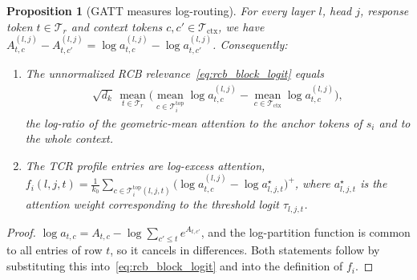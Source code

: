 \documentclass{article}
\newtheorem{proposition}{Proposition}
\begin{document}
\begin{proposition}[GATT measures log-routing]\label{prop:gatt_log_routing}
For every layer $l$, head $j$, response token $t \in \mathcal{T}_r$ and context tokens $c, c' \in \mathcal{T}_{\text{ctx}}$, we have $A^{(l,j)}_{t,c} - A^{(l,j)}_{t,c'} = \log a^{(l,j)}_{t,c} - \log a^{(l,j)}_{t,c'}$. Consequently:
\begin{enumerate}
    \item[(i)] The unnormalized RCB relevance~\eqref{eq:rcb_block_logit} equals
    \begin{align}
        \sqrt{d_k}\, \operatorname*{mean}_{t \in \mathcal{T}_r} \Big( \operatorname*{mean}_{c \in \mathcal{T}_i^{\text{top}}} \log a^{(l,j)}_{t,c} - \operatorname*{mean}_{c \in \mathcal{T}_{\text{ctx}}} \log a^{(l,j)}_{t,c} \Big),
    \end{align}
    the log-ratio of the geometric-mean attention to the anchor tokens of $s_i$ and to the whole context.
    \item[(ii)] The TCR profile entries are log-excess attention, $f_i(l,j,t) = \frac{1}{k_0} \sum_{c \in \mathcal{T}_i^{\text{top}}(l,j,t)} \big( \log a^{(l,j)}_{t,c} - \log a^{\star}_{l,j,t} \big)^+$, where $a^{\star}_{l,j,t}$ is the attention weight corresponding to the threshold logit $\tau_{l,j,t}$.
\end{enumerate}
\end{proposition}

\begin{proof}
$\log a_{t,c} = A_{t,c} - \log \sum_{c' \le t} e^{A_{t,c'}}$, and the log-partition function is common to all entries of row $t$, so it cancels in differences. Both statements follow by substituting this into~\eqref{eq:rcb_block_logit} and into the definition of $f_i$.
\end{proof}
\end{document}
